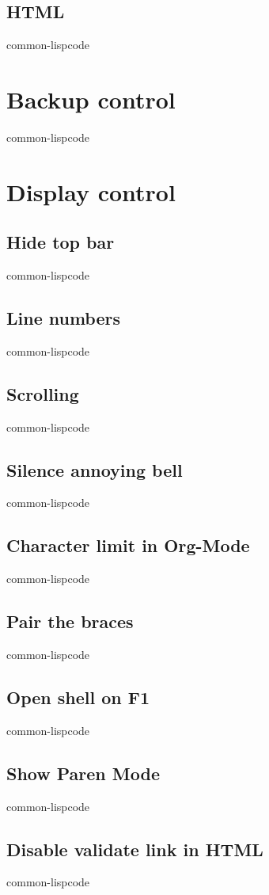 \documentclass[11pt]{article}
\begin{document}
\subsection{HTML}
\label{sec:org36a56af}
common-lispcode
\section{Backup control}
\label{sec:orga97c50d}
common-lispcode
\section{Display control}
\label{sec:org7cfcdf3}
\subsection{Hide top bar}
\label{sec:orgefa385c}
common-lispcode
\subsection{Line numbers}
\label{sec:org42086d4}
common-lispcode
\subsection{Scrolling}
\label{sec:org4ffbe4c}
common-lispcode
\subsection{Silence annoying bell}
\label{sec:org5e47d41}
common-lispcode
\subsection{Character limit in Org-Mode}
\label{sec:org0ea6af1}
common-lispcode
\subsection{Pair the braces}
\label{sec:org431e9c4}
common-lispcode
\subsection{Open shell on F1}
\label{sec:org72a3822}
common-lispcode
\subsection{Show Paren Mode}
\label{sec:org36eb69d}
common-lispcode
\subsection{Disable validate link in HTML}
\label{sec:orgf43c651}
common-lispcode
\end{document}
